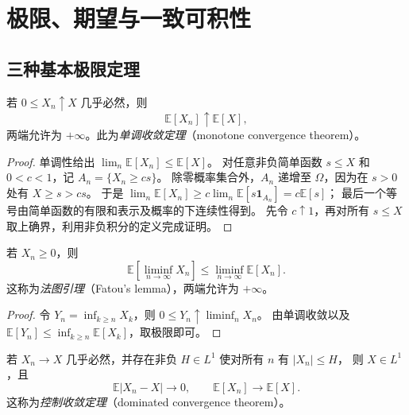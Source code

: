 \documentclass[UTF8,12pt,a4paper,fontset=fandol]{ctexart}
\begin{document}
\section{极限、期望与一致可积性}
\label{sec:expectation-limits}

\subsection{三种基本极限定理}

\begin{theorem}[单调收敛定理]
\label{thm:expectation-mct}
若 $0\leq X_n\uparrow X$ 几乎必然，则
\[
  \mathbb E[X_n]\uparrow\mathbb E[X],
\]
两端允许为 $+\infty$。此为\emph{单调收敛定理}（monotone convergence theorem）。
\end{theorem}

\begin{proof}
单调性给出 $\lim_n\mathbb E[X_n]\leq\mathbb E[X]$。
对任意非负简单函数 $s\leq X$ 和 $0<c<1$，记 $A_n=\{X_n\geq cs\}$。
除零概率集合外，$A_n$ 递增至 $\Omega$，因为在 $s>0$ 处有 $X\geq s>cs$。
于是
$\lim_n\mathbb E[X_n]\geq c\lim_n\mathbb E[s\mathbf1_{A_n}]=c\mathbb E[s]$；
最后一个等号由简单函数的有限和表示及概率的下连续性得到。
先令 $c\uparrow1$，再对所有 $s\leq X$ 取上确界，利用非负积分的定义完成证明。
\end{proof}

\begin{theorem}[Fatou 引理]
\label{thm:expectation-fatou}
若 $X_n\geq0$，则
\begin{equation}
  \mathbb E[\liminf_{n\to\infty}X_n]
  \leq\liminf_{n\to\infty}\mathbb E[X_n].
  \label{eq:expectation-fatou}
\end{equation}
这称为\emph{法图引理}（Fatou's lemma），两端允许为 $+\infty$。
\end{theorem}

\begin{proof}
令 $Y_n=\inf_{k\geq n}X_k$，则 $0\leq Y_n\uparrow\liminf_nX_n$。
由单调收敛以及
$\mathbb E[Y_n]\leq\inf_{k\geq n}\mathbb E[X_k]$，取极限即可。
\end{proof}

\begin{theorem}[控制收敛定理]
\label{thm:expectation-dct}
若 $X_n\to X$ 几乎必然，并存在非负 $H\in L^1$ 使对所有 $n$ 有 $|X_n|\leq H$，
则 $X\in L^1$，且
\[
  \mathbb E|X_n-X|\longrightarrow0,
  \qquad
  \mathbb E[X_n]\longrightarrow\mathbb E[X].
\]
这称为\emph{控制收敛定理}（dominated convergence theorem）。
\end{theorem}
\end{document}
